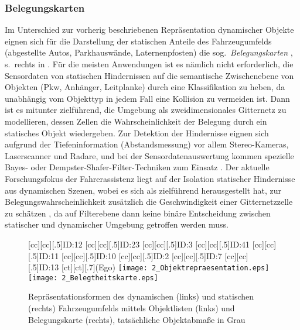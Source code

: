 \subsubsection{Belegungskarten}
Im Unterschied zur vorherig beschriebenen Repräsentation dynamischer Objekte eignen sich für die Darstellung der statischen Anteile des Fahrzeugumfelds (abgestellte Autos, Parkhauswände, Laternenpfosten) die sog.\ \emph{Belegungskarten} \cite{moravec1985high,Thrun2005}, s.\ rechts in . Für die meisten Anwendungen ist es nämlich nicht erforderlich, die Sensordaten von statischen Hindernissen auf die semantische Zwischenebene von Objekten (Pkw, Anhänger, Leitplanke) durch eine Klassifikation zu heben, da unabhängig vom Objekttyp in jedem Fall eine Kollision zu vermeiden ist. Dann ist es mitunter zielführend, die Umgebung als zweidimensionales Gitternetz zu modellieren, dessen Zellen die Wahrscheinlichkeit der Belegung durch ein statisches Objekt wiedergeben. Zur Detektion der Hindernisse eignen sich aufgrund der Tiefeninformation (Abstandsmessung) vor allem Stereo-Kameras, Laserscanner und Radare, und bei der Sensordatenauswertung kommen spezielle Bayes- oder Dempster-Shafer-Filter-Techniken zum Einsatz \cite{Thrun2005, Moras2011ICRA}. Der aktuelle Forschungsfokus der Fahrerassistenz liegt auf der Isolation statischer Hindernisse aus dynamischen Szenen, wobei es sich als zielführend herausgestellt hat, zur Belegungswahrscheinlichkeit zusätzlich die Geschwindigkeit einer Gitternetzzelle zu schätzen \cite{brechtel2010recursive, Tanzmeister2014Grid}, da auf Filterebene dann keine binäre Entscheidung zwischen statischer und dynamischer Umgebung getroffen werden muss.

\begin{figure}[h]
\newcommand{\smallsize}{.5}
	[cc][cc][\smallsize]{ID:12}
	[cc][cc][\smallsize]{ID:23}
	[cc][cc][\smallsize]{ID:3}
	[cc][cc][\smallsize]{ID:41}
	[cc][cc][\smallsize]{ID:11}
	[cc][cc][\smallsize]{ID:10}
	[cc][cc][\smallsize]{ID:2}
	[cc][cc][\smallsize]{ID:7}
	[cc][cc][\smallsize]{ID:13}
	[ct][ct][.7]{(Ego)}
\texttt{[image: 2\_Objektrepraesentation.eps]}
	\hspace{.5cm}
	\texttt{[image: 2\_Belegtheitskarte.eps]}
 \caption[Repräsentationsformen des Fahrzeugumfelds]{Repräsentationsformen des dynamischen (links) und statischen (rechts) Fahrzeugumfelds mittels Objektlisten (links) und Belegungskarte (rechts), tatsächliche Objektabmaße in Grau}
 \label{fig:Objektrepraesentation}
\end{figure}

